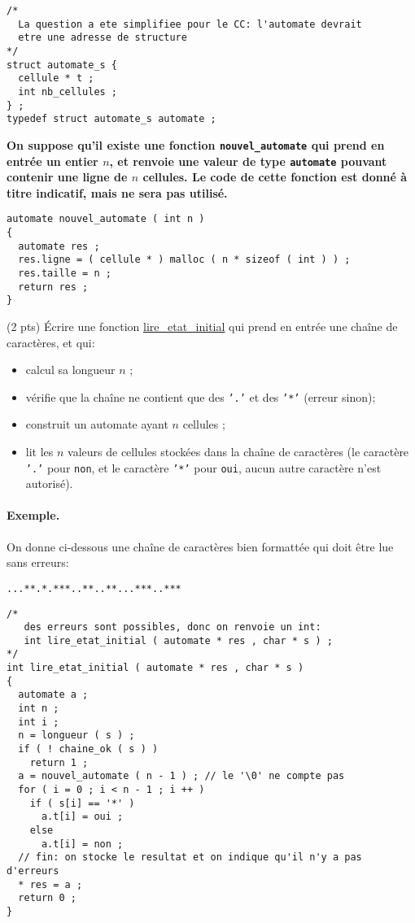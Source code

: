 \begin{solution}
  \begin{lstlisting}
/*
  La question a ete simplifiee pour le CC: l'automate devrait
  etre une adresse de structure
*/
struct automate_s {
  cellule * t ;
  int nb_cellules ;
} ;
typedef struct automate_s automate ; 
  \end{lstlisting}
\end{solution}



{\bf On suppose qu'il existe une fonction \texttt{nouvel\_automate}
  qui prend en entrée un entier \(n\), et renvoie une valeur de type
  \texttt{automate} pouvant contenir une ligne de \(n\)
  cellules. Le code de cette fonction est donné à titre indicatif, mais ne sera pas utilisé.}

\begin{lstlisting}
automate nouvel_automate ( int n )
{
  automate res ;
  res.ligne = ( cellule * ) malloc ( n * sizeof ( int ) ) ;
  res.taille = n ;
  return res ;
}
\end{lstlisting}

\question (2 pts) {\'E}crire une fonction \url{lire_etat_initial} qui
prend en entr{\'e}e une chaîne de caractères, et qui:
\begin{itemize}
\item calcul sa longueur \(n\) ;
\item vérifie que la chaîne ne contient que des \texttt{'.'}
et des \texttt{'*'} (erreur sinon);
\item construit un automate ayant \(n\) cellules ;
\item lit les $n$ valeurs de cellules stock{\'e}es dans la chaîne de caractères
(le caract{\`e}re \texttt{'.'} pour \texttt{non}, et le caract{\`e}re 
\texttt{'*'} pour \texttt{oui}, aucun autre caract{\`e}re n'est autoris{\'e}).
\end{itemize}

\paragraph{Exemple.} On donne ci-dessous une chaîne de caractères bien
formatt{\'e}e qui doit {\^e}tre lue sans erreurs:
\begin{verbatim}
...**.*.***..**..**...***..***
\end{verbatim}
\begin{solution}
  \begin{lstlisting}
/*
   des erreurs sont possibles, donc on renvoie un int:
   int lire_etat_initial ( automate * res , char * s ) ;
*/
int lire_etat_initial ( automate * res , char * s )
{
  automate a ;
  int n ;
  int i ;
  n = longueur ( s ) ;
  if ( ! chaine_ok ( s ) )
    return 1 ;
  a = nouvel_automate ( n - 1 ) ; // le '\0' ne compte pas
  for ( i = 0 ; i < n - 1 ; i ++ )
    if ( s[i] == '*' )
      a.t[i] = oui ;
    else
      a.t[i] = non ;
  // fin: on stocke le resultat et on indique qu'il n'y a pas d'erreurs
  * res = a ;
  return 0 ;
} 
  \end{lstlisting}
\end{solution}

